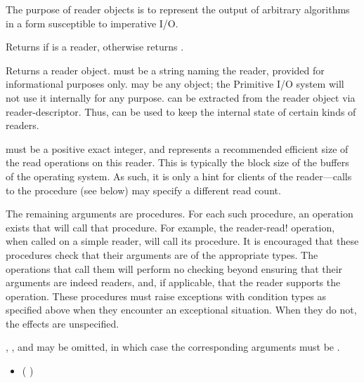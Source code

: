 The purpose of reader objects is to represent the output of arbitrary
algorithms in a form susceptible to imperative I/O.

\begin{entry}{%
}
   
Returns \schtrue{} if  is a reader, otherwise returns \schfalse.
\end{entry}

\begin{entry}{%
}

Returns a reader object.  must be a string naming the reader,
provided for informational purposes only.  may be any
object; the Primitive I/O system will not use it internally for any
purpose.  can be extracted from the reader object via
{\cf reader-descriptor}. Thus,  can be used to keep the
internal state of certain kinds of readers.
   
 must be a positive exact integer, and represents a recommended
efficient size of the read operations on this reader. This is typically the
block size of the buffers of the operating system. As such, it is only a
hint for clients of the reader---calls to the  procedure (see below)
may specify a different read count.
   
The remaining arguments are procedures.  For each such procedure, an
operation exists that will call that procedure.  For example, the {\cf
  reader-read!} operation, when called on a simple reader, will call
its  procedure.
It is encouraged that these procedures check that their arguments are
of the appropriate types.  The operations that call them will perform
no checking beyond ensuring that their  arguments are
indeed readers, and, if applicable, that the reader supports the operation.
These procedures must raise
exceptions with condition types as specified above when they encounter an
exceptional situation. When they do not, the effects are unspecified.

, , and  may be
omitted, in which case the corresponding arguments must be \schfalse.
   
\begin{itemize}
\item {\cf (   )}
       

\end{itemize}
\end{entry}
